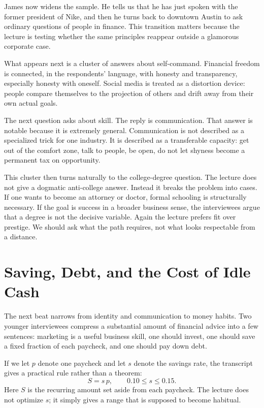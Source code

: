 James now widens the sample. He tells us that he has just spoken with the former president of Nike, and then he turns back to downtown Austin to ask ordinary questions of people in finance. This transition matters because the lecture is testing whether the same principles reappear outside a glamorous corporate case.

What appears next is a cluster of answers about self-command. Financial freedom is connected, in the respondents' language, with honesty and transparency, especially honesty with oneself. Social media is treated as a distortion device: people compare themselves to the projection of others and drift away from their own actual goals.

The next question asks about skill. The reply is communication. That answer is notable because it is extremely general. Communication is not described as a specialized trick for one industry. It is described as a transferable capacity: get out of the comfort zone, talk to people, be open, do not let shyness become a permanent tax on opportunity.

This cluster then turns naturally to the college-degree question. The lecture does not give a dogmatic anti-college answer. Instead it breaks the problem into cases. If one wants to become an attorney or doctor, formal schooling is structurally necessary. If the goal is success in a broader business sense, the interviewees argue that a degree is not the decisive variable. Again the lecture prefers fit over prestige. We should ask what the path requires, not what looks respectable from a distance.

\section{Saving, Debt, and the Cost of Idle Cash}

The next beat narrows from identity and communication to money habits. Two younger interviewees compress a substantial amount of financial advice into a few sentences: marketing is a useful business skill, one should invest, one should save a fixed fraction of each paycheck, and one should pay down debt.

If we let \(p\) denote one paycheck and let \(s\) denote the savings rate, the transcript gives a practical rule rather than a theorem:
\begin{equation}
S = s\,p, \qquad 0.10 \le s \le 0.15.
\end{equation}
Here \(S\) is the recurring amount set aside from each paycheck. The lecture does not optimize \(s\); it simply gives a range that is supposed to become habitual.

